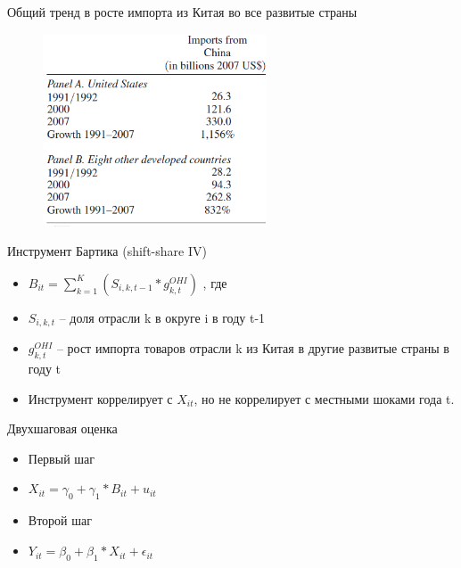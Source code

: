 \begin{frame}{Общий тренд в росте импорта из Китая во все развитые страны}
 \begin{figure}
 \centering
       \includegraphics[width=250]{Lecture_Sources/Images/Bartik_common_trends.png}
  \end{figure}
 \end{frame}
 
\begin{frame}{Инструмент Бартика (shift-share IV)}
    \begin{itemize}
          \item$B_{it}=\sum\limits_{k=1}^K(S_{i,k,t-1}*g_{k,t}^{OHI})$ , где
      \item $S_{i,k,t}$ -- доля отрасли k в округе i в году t-1
      \item $g_{k,t}^{OHI}$ --  рост импорта товаров отрасли k из Китая в другие развитые страны в году t
      \item Инструмент коррелирует с $X_{it}$, но не коррелирует с местными шоками года t. 
    \end{itemize}
\end{frame}

\begin{frame}{Двухшаговая оценка}
  \begin{itemize}
      \item Первый шаг
      \item $X_{it}=\gamma_0+\gamma_1*B_{it}+u_{it}$  
      \item Второй шаг
      \item $Y_{it}=\beta_0+\beta_1*\widehat{X_{it}}+\epsilon_{it}$
  \end{itemize}
\end{frame}

